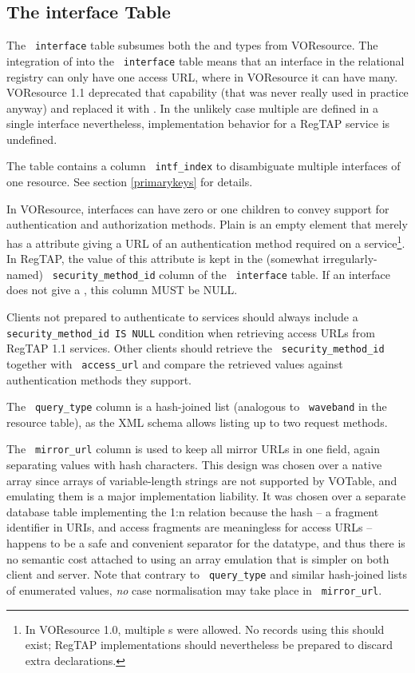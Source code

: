 \documentclass[11pt,a4paper]{ivoa}
\newcommand{\rtent}[1]{\texttt{\color{rtcolor} #1}}
\begin{document}
\subsection{The interface Table}

\label{table_interface}

The \rtent{interface} table subsumes both the
 and  types from
VOResource.  The integration of   into
the \rtent{interface}  table means that an interface in the
relational registry can only have one access URL, where in VOResource it
can have many.  VOResource 1.1 deprecated that capability (that was
never really used in practice anyway) and replaced it with
.
In the unlikely case multiple  are defined in a single
interface nevertheless, implementation behavior for a RegTAP service is
undefined.

The table contains a column \rtent{intf\_index} to disambiguate
multiple interfaces of one resource. See section \ref{primarykeys} for details.

In VOResource, interfaces can have zero or one 
children to convey support for authentication and authorization methods.
Plain  is an empty element that merely has a
 attribute giving a URL of an authentication method
required on a service\footnote{In VOResource 1.0, multiple
s were allowed.  No records using this should
exist; RegTAP implementations should nevertheless be prepared to discard
extra  declarations.}.  In RegTAP, the value of
this attribute is kept in the (somewhat irregularly-named)
\rtent{security\_method\_id} column of the \rtent{interface} table.  If
an interface does not give a , this column MUST
be NULL.

Clients not prepared to authenticate to services should always include a
\verb|security_method_id IS NULL| condition when retrieving access URLs
from RegTAP 1.1 services.  Other clients should retrieve the
\rtent{security\_method\_id} together with \rtent{access\_url} and
compare the retrieved values against authentication methods they
support.

The \rtent{query\_type} column is a hash-joined list (analogous
to \rtent{waveband} in the resource table), as
the XML schema allows listing up to two request methods.

The \rtent{mirror\_url} column is used to keep all mirror URLs in one
field, again separating values with hash characters.  This design was
chosen over a native array since arrays of variable-length strings are
not supported by VOTable, and emulating them is a major implementation
liability.  It was chosen over a separate database table implementing
the 1:n relation because the hash -- a fragment identifier in URIs, and
access fragments are meaningless for access URLs -- happens to be a safe and
convenient separator for the datatype, and thus there is no semantic
cost attached to using an array emulation that is simpler on both client
and server.  Note that contrary to \rtent{query\_type} and similar
hash-joined lists of enumerated values, \emph{no} case normalisation
may take place in \rtent{mirror\_url}.
\end{document}
